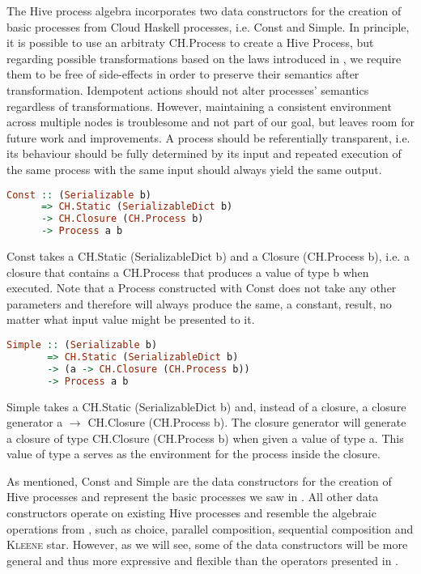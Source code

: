 The Hive process algebra incorporates two data constructors for the creation of basic processes from Cloud Haskell processes, i.e. \textsf{Const} and \textsf{Simple}. In principle, it is possible to use an arbitraty \textsf{CH.Process} to create a Hive \textsf{Process}, but regarding possible transformations based on the laws introduced in , we require them to be free of side-effects in order to preserve their semantics after transformation. Idempotent actions should not alter processes' semantics regardless of transformations. However, maintaining a consistent environment across multiple nodes is troublesome and not part of our goal, but leaves room for future work and improvements. A process should be referentially transparent, i.e. its behaviour should be fully determined by its input and repeated execution of the same process with the same input should always yield the same output.
\begin{lstlisting}[language=Haskell]
Const :: (Serializable b) 
      => CH.Static (SerializableDict b)
      -> CH.Closure (CH.Process b)
      -> Process a b
\end{lstlisting}
\textsf{Const} takes a \textsf{CH.Static (SerializableDict b)} and a \textsf{Closure (CH.Process b)}, i.e. a closure that contains a \textsf{CH.Process} that produces a value of type \textsf{b} when executed. Note that a \textsf{Process} constructed with \textsf{Const} does not take any other parameters and therefore will always produce the same, a constant, result, no matter what input value might be presented to it. 

\begin{lstlisting}[language=Haskell]
Simple :: (Serializable b) 
       => CH.Static (SerializableDict b)
       -> (a -> CH.Closure (CH.Process b))
       -> Process a b
\end{lstlisting}
\textsf{Simple} takes a \textsf{CH.Static (SerializableDict b)} and, instead of a closure, a closure generator \textsf{a $\to$ CH.Closure (CH.Process b)}. The closure generator will generate a closure of type \textsf{CH.Closure (CH.Process b)} when given a value of type \textsf{a}. This value of type \textsf{a} serves as the environment for the process inside the closure.

As mentioned, \textsf{Const} and \textsf{Simple} are the data constructors for the creation of Hive processes and represent the basic processes we saw in . All other data constructors operate on existing Hive processes and resemble the algebraic operations from , such as choice, parallel composition, sequential composition and \textsc{Kleene} star. However, as we will see, some of the data constructors will be more general and thus more expressive and flexible than the operators presented in .


